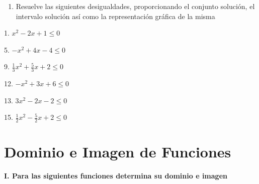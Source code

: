 \documentclass[]{book}
\providecommand{\tightlist}{%
  \setlength{\itemsep}{0pt}\setlength{\parskip}{0pt}}
\begin{document}
\begin{enumerate}
\def\labelenumi{\arabic{enumi}.}
\setcounter{enumi}{29}
\tightlist
\item
  Resuelve las siguientes desigualdades, proporcionando el conjunto
  solución, el intervalo solución así como la representación gráfica de
  la misma
\end{enumerate}

\begin{multicols}{2}
1. $x^2-2x+1\leq0$

5. $-x^2+4x-4\leq0$

9. $\frac{1}{3}x^2+\frac{5}{3}x+2\leq0$

12. $-x^2+3x+6\leq0$

13. $3x^2-2x-2\leq0$

15. $\frac{1}{2}x^2-\frac{5}{2}x+2\leq0$
\end{multicols}

\chapter{Dominio e Imagen de
Funciones}\label{dominio-e-imagen-de-funciones}

\textbf{I. Para las siguientes funciones determina su dominio e imagen}
\end{document}
